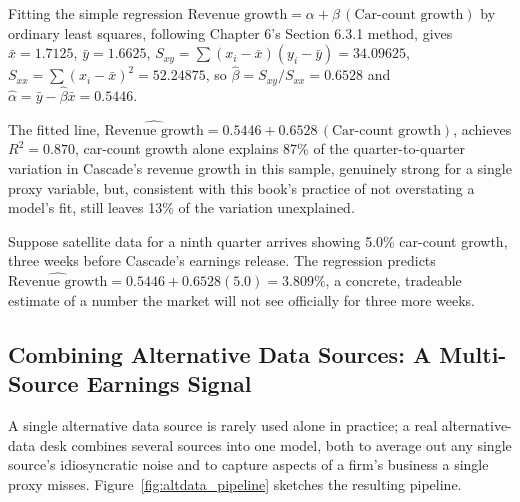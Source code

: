 \documentclass[../ai_in_finance]{subfiles}
\begin{document}
Fitting the simple regression $\text{Revenue growth} = \alpha + \beta\,(\text{Car-count growth})$ by ordinary least squares, following Chapter 6's Section 6.3.1 method, gives $\bar x = 1.7125$, $\bar y = 1.6625$, $S_{xy} = \sum(x_i - \bar x)(y_i - \bar y) = 34.09625$, $S_{xx} = \sum(x_i-\bar x)^2 = 52.24875$, so $\hat\beta = S_{xy}/S_{xx} = 0.6528$ and $\hat\alpha = \bar y - \hat\beta \bar x = 0.5446$.

The fitted line, $\widehat{\text{Revenue growth}} = 0.5446 + 0.6528\,(\text{Car-count growth})$, achieves $R^2 = 0.870$, car-count growth alone explains 87\% of the quarter-to-quarter variation in Cascade's revenue growth in this sample, genuinely strong for a single proxy variable, but, consistent with this book's practice of not overstating a model's fit, still leaves 13\% of the variation unexplained.

Suppose satellite data for a ninth quarter arrives showing 5.0\% car-count growth, three weeks before Cascade's earnings release. The regression predicts $\widehat{\text{Revenue growth}} = 0.5446 + 0.6528(5.0) = 3.809\%$, a concrete, tradeable estimate of a number the market will not see officially for three more weeks.

\subsection{Combining Alternative Data Sources: A Multi-Source Earnings Signal}
\label{sec:alt-data-pipeline}

A single alternative data source is rarely used alone in practice; a real alternative-data desk combines several sources into one model, both to average out any single source's idiosyncratic noise and to capture aspects of a firm's business a single proxy misses. Figure~\ref{fig:altdata_pipeline} sketches the resulting pipeline.
\end{document}
